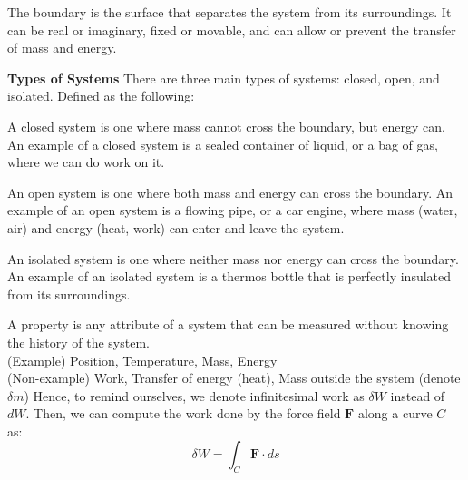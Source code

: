 \documentclass[11pt]{report}
\begin{document}
\begin{definition}[Boundary]
    The boundary is the surface that separates the system from its surroundings. It can be real or imaginary, fixed or movable, and can allow or prevent the transfer of mass and energy.
\end{definition}

\textbf{Types of Systems} There are three main types of systems: closed, open, and isolated. Defined as the following:
\begin{definition}
    A closed system is one where mass cannot cross the boundary, but energy can. An example of a closed system is a sealed container of liquid, or a bag of gas, where we can do work on it.
\end{definition}
\begin{definition}
    An open system is one where both mass and energy can cross the boundary. An example of an open system is a flowing pipe, or a car engine, where mass (water, air) and energy (heat, work) can enter and leave the system.
\end{definition}
\begin{definition}
    An isolated system is one where neither mass nor energy can cross the boundary. An example of an isolated system is a thermos bottle that is perfectly insulated from its surroundings.
\end{definition}
\begin{definition}[Property]
    A property is any attribute of a system that can be measured without knowing the history of the system. \\
    (Example) Position, Temperature, Mass, Energy \\
    (Non-example) Work, Transfer of energy (heat), Mass outside the system (denote $\delta m$)
    Hence, to remind ourselves, we denote infinitesimal work as $\delta W$ instead of $dW$. Then, we can compute the work done by the force field $\textbf{F}$ along a curve $C$ as:
    \begin{equation}
        \delta W = \int_C \textbf{F} \cdot ds
    \end{equation}
\end{definition}
\end{document}
